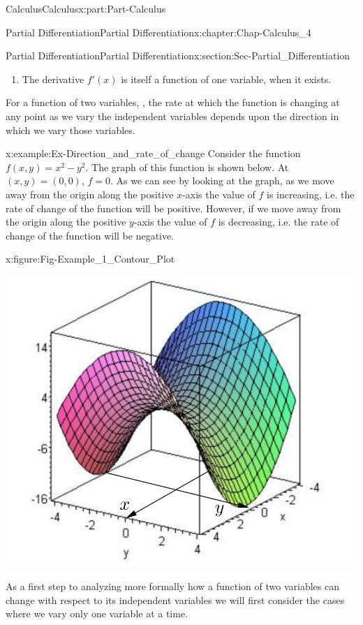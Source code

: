 \documentclass[oneside,10pt,]{book}
\numberwithin{equation}{section}
\begin{document}
\begin{partptx}{Calculus}{}{Calculus}{}{}{x:part:Part-Calculus}
\begin{chapterptx}{Partial Differentiation}{}{Partial Differentiation}{}{}{x:chapter:Chap-Calculus_4}
\begin{sectionptx}{Partial Differentiation}{}{Partial Differentiation}{}{}{x:section:Sec-Partial_Differentiation}
\begin{enumerate}[label=\roman*]
\item{}The derivative \(f'(x)\) is itself a function of one variable, when it exists.%
\end{enumerate}
%
\par
For a function of two variables,  , the rate at which the function is changing at any point as we vary the independent variables depends upon the direction in which we vary those variables.%
\begin{example}{}{x:example:Ex-Direction_and_rate_of_change}%
Consider the function \(f(x,y) = x^2-y^2\). The graph of this function is shown below. At \((x,y)=(0,0)\), \(f=0\). As we can see by looking at the graph, as we move away from the origin along the positive \(x\)-axis the value of \(f\) is increasing, i.e. the rate of change of the function will be positive. However, if we move away from the origin along the positive \(y\)-axis the value of \(f\) is decreasing, i.e. the rate of change of the function will be negative.%
\begin{figureptx}{}{x:figure:Fig-Example_1_Contour_Plot}{}%
\begin{image}{0.15}{0.7}{0.15}%
\includegraphics[width=\linewidth]{./Calculus/Images/4/Ex1_Contour_Plot_Fig_1.png}
\end{image}%
\tcblower
\end{figureptx}%
\end{example}
As a first step to analyzing more formally how a function of two variables can change with respect to its independent variables we will first consider the cases where we vary only one variable at a time.%

\end{sectionptx}
\end{chapterptx}
\end{partptx}
\end{document}
